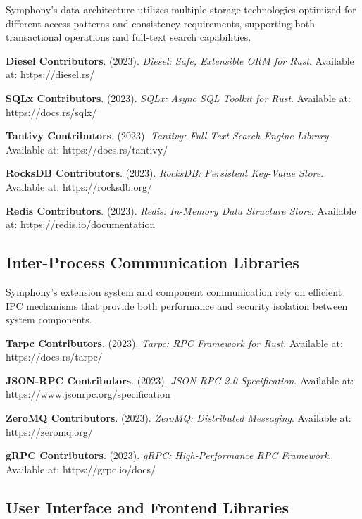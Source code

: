 Symphony's data architecture utilizes multiple storage technologies optimized for different access patterns and consistency requirements, supporting both transactional operations and full-text search capabilities.

\begin{compactlist}
    \item \textbf{Diesel Contributors}. (2023). \textit{Diesel: Safe, Extensible ORM for Rust}. Available at: https://diesel.rs/
    \item \textbf{SQLx Contributors}. (2023). \textit{SQLx: Async SQL Toolkit for Rust}. Available at: https://docs.rs/sqlx/
    \item \textbf{Tantivy Contributors}. (2023). \textit{Tantivy: Full-Text Search Engine Library}. Available at: https://docs.rs/tantivy/
    \item \textbf{RocksDB Contributors}. (2023). \textit{RocksDB: Persistent Key-Value Store}. Available at: https://rocksdb.org/
    \item \textbf{Redis Contributors}. (2023). \textit{Redis: In-Memory Data Structure Store}. Available at: https://redis.io/documentation
\end{compactlist}

\subsection*{Inter-Process Communication Libraries}

Symphony's extension system and component communication rely on efficient IPC mechanisms that provide both performance and security isolation between system components.

\begin{compactlist}
    \item \textbf{Tarpc Contributors}. (2023). \textit{Tarpc: RPC Framework for Rust}. Available at: https://docs.rs/tarpc/
    \item \textbf{JSON-RPC Contributors}. (2023). \textit{JSON-RPC 2.0 Specification}. Available at: https://www.jsonrpc.org/specification
    \item \textbf{ZeroMQ Contributors}. (2023). \textit{ZeroMQ: Distributed Messaging}. Available at: https://zeromq.org/
    \item \textbf{gRPC Contributors}. (2023). \textit{gRPC: High-Performance RPC Framework}. Available at: https://grpc.io/docs/
\end{compactlist}

\subsection*{User Interface and Frontend Libraries}

